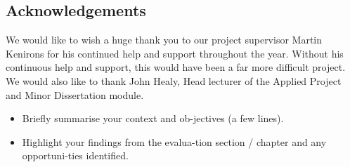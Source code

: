 \subsection{Acknowledgements}
We would like to wish a huge thank you to our project supervisor Martin Kenirons for his continued help and support throughout the year. Without his continuous help and support, this would have been a far more difficult project. We would also like to thank John Healy, Head lecturer of the Applied Project and Minor Dissertation module.

\begin{itemize}
\item Briefly summarise your context and ob-jectives (a few lines).
\item Highlight your findings from the evalua-tion section / chapter and any opportuni-ties identified.
\end{itemize}

